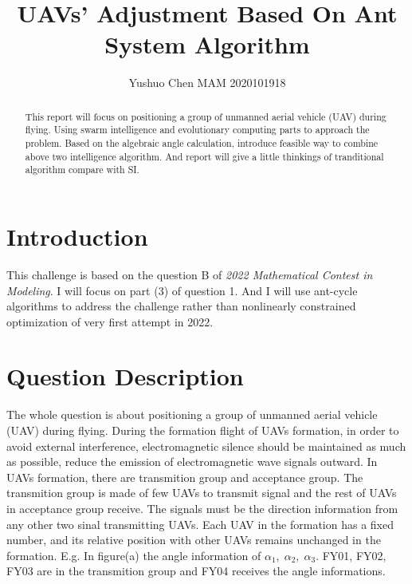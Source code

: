 \documentclass[lang=cn,a4paper,newtx]{elegantpaper}
\title{UAVs' Adjustment Based On Ant System Algorithm}
\author{Yushuo Chen MAM 2020101918}
\begin{document}
\maketitle

\begin{abstract}
This report will focus on positioning a group of unmanned aerial vehicle (UAV) during flying.
Using swarm intelligence and evolutionary computing parts to approach the problem.
Based on the algebraic angle calculation, introduce feasible way to combine above two intelligence algorithm.
And report will give a little thinkings of tranditional algorithm compare with SI.
\end{abstract}

\section{Introduction}
This challenge is based on the question B of \textit{2022 Mathematical Contest in Modeling}.
I will focus on part (3) of question 1.
And I will use ant-cycle algorithms to address the challenge rather than nonlinearly constrained optimization of very first attempt in 2022.

\section{Question Description}
The whole question is about positioning a group of unmanned aerial vehicle (UAV) during flying.
During the formation flight of UAVs formation, in order to avoid external interference, 
electromagnetic silence should be maintained as much as possible, reduce the emission of electromagnetic wave signals outward.
In UAVs formation, there are transmition group and acceptance group.
The transmition group is made of few UAVs to transmit signal and the rest of UAVs in acceptance group receive.
The signals must be the direction information from any other two sinal transmitting UAVs.
Each UAV in the formation has a fixed number, and its relative position with other UAVs remains unchanged in the formation.
E.g. In figure(a) the angle information of $\alpha_1,\;\alpha_2,\;\alpha_3$.
FY01, FY02, FY03 are in the transmition group and FY04 receives the angle informations.

\begin{figure}[htbp]
  \centering
\end{figure}
\end{document}
